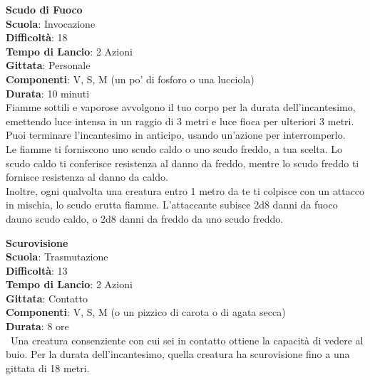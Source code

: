 \begin{multicols}{2}
\medskip\textbf{Scudo di Fuoco}\\
\textbf{Scuola}: Invocazione\\
\textbf{Difficoltà}:  18\\
\textbf{Tempo di Lancio}: 2 Azioni\\
\textbf{Gittata}: Personale\\
\textbf{Componenti}: V, S, M (un po’ di fosforo o una lucciola) \\
\textbf{Durata}: 10 minuti\\
Fiamme sottili e vaporose avvolgono il tuo corpo per la durata dell'incantesimo, emettendo luce intensa in un raggio di 3 metri e luce fioca per ulteriori 3 metri. Puoi terminare l'incantesimo in anticipo, usando un'azione per interromperlo.\\
Le fiamme ti forniscono uno scudo caldo o uno scudo freddo, a tua scelta. Lo scudo caldo ti conferisce resistenza al danno da freddo, mentre lo scudo freddo ti fornisce resistenza al danno da caldo.\\
Inoltre, ogni qualvolta una creatura entro 1 metro da te ti colpisce con un attacco in mischia, lo scudo erutta fiamme. L’attaccante subisce 2d8 danni da fuoco dauno scudo caldo, o 2d8 danni da  freddo da uno scudo freddo.

\medskip\textbf{Scurovisione}\\
\textbf{Scuola}: Trasmutazione\\
\textbf{Difficoltà}:  13\\
\textbf{Tempo di Lancio}: 2 Azioni\\
\textbf{Gittata}: Contatto\\
\textbf{Componenti}: V, S, M (o un pizzico di carota o di agata secca)\\
\textbf{Durata}: 8 ore\\\
Una creatura consenziente con cui sei in contatto ottiene la capacità di vedere al buio. Per la durata dell'incantesimo, quella creatura ha scurovisione fino a una gittata di 18 metri.


\end{multicols}
